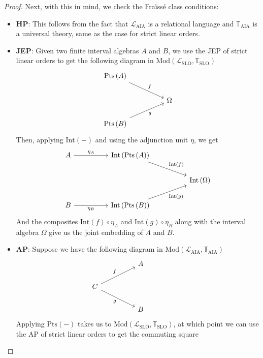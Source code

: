 \documentclass[11pt %
              ]{article}
\newcommand{\unit}[1]{\eta_{#1}}
\newcommand{\lang}{\mathcal{L}}
\newcommand{\theory}{\mathbb{T}}
\newcommand{\lslo}{\lang_\text{SLO}}
\newcommand{\tslo}{\theory_\text{SLO}}
\newcommand{\laia}{\lang_\text{AIA}}
\newcommand{\taia}{\theory_\text{AIA}}
\newcommand{\mods}[2]{\text{Mod}\left(#1,#2\right)}
\newcommand{\aias}{\mods{\laia}{\taia}}
\newcommand{\slos}{\mods{\lslo}{\tslo}}
\newcommand{\inter}[1][-]{\text{Int}\left(#1\right)}
\newcommand{\points}[1][-]{\text{Pts}\left(#1\right)}
\theoremstyle{plain}
\theoremstyle{definition}
\theoremstyle{remark}
\begin{document}
\begin{proof}
  Next, with this in mind, we check the Fraïssé class conditions:
  \begin{itemize}
    \item \textbf{HP}: This follows from the fact that $\laia$ is a relational language and
      $\taia$ is a universal theory, same as the case for strict linear orders.
    \item \textbf{JEP}: Given two finite interval algebras $A$ and $B$, we use the JEP of strict
      linear orders to get the following diagram in $\slos$
      \[\begin{tikzcd}
        {\points[A]} \\
        && \Omega \\
        {\points[B]}
        \arrow["f", from=1-1, to=2-3]
        \arrow["g"', from=3-1, to=2-3]
      \end{tikzcd}\]
      Then, applying $\inter$ and using the adjunction unit $\eta$, we get
      \[\begin{tikzcd}
        A && {\inter[\points[A]]} \\
        &&&& {\inter[\Omega]} \\
        B && {\inter[\points[B]]}
        \arrow["{\inter[f]}", from=1-3, to=2-5]
        \arrow["{\inter[g]}"', from=3-3, to=2-5]
        \arrow["{\unit{B}}"', from=3-1, to=3-3]
        \arrow["{\unit{A}}", from=1-1, to=1-3]
      \end{tikzcd}\]
      And the composites $\inter[f] \circ \unit{A}$ and $\inter[g] \circ \unit{B}$ along with
      the interval algebra $\Omega$ give us the joint embedding of $A$ and $B$.
    \item \textbf{AP}: Suppose we have the following diagram in $\aias$
      \[\begin{tikzcd}
        && A \\
        C &&&& {} \\
        && B
        \arrow["f", from=2-1, to=1-3]
        \arrow["g"', from=2-1, to=3-3]
      \end{tikzcd}\]
      Applying $\points$ takes us to $\slos$, at which point we can use the AP of strict linear
      orders to get the commuting square

\end{itemize}
\end{proof}
\end{document}
